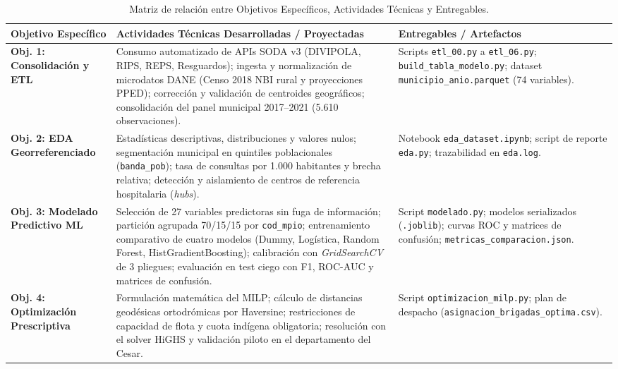 \documentclass[12pt]{article}
\begin{document}
\begin{table}[htbp]
\centering
\scriptsize
\caption{Matriz de relación entre Objetivos Específicos, Actividades Técnicas y Entregables.}
\label{tab:actividades}
\begin{tabular}{@{}>{\raggedright\arraybackslash}p{3.2cm}
                    >{\raggedright\arraybackslash}p{6.6cm}
                    >{\raggedright\arraybackslash}p{4.2cm}@{}}
\toprule
\textbf{Objetivo Específico} & \textbf{Actividades Técnicas Desarrolladas / Proyectadas} & \textbf{Entregables / Artefactos} \\
\midrule
\textbf{Obj. 1: Consolidación y ETL} & 
Consumo automatizado de APIs SODA v3 (DIVIPOLA, RIPS, REPS, Resguardos); ingesta y normalización de microdatos DANE (Censo 2018 NBI rural y proyecciones PPED); corrección y validación de centroides geográficos; consolidación del panel municipal 2017--2021 (5.610 observaciones). & 
Scripts \texttt{etl\_00.py} a \texttt{etl\_06.py}; \texttt{build\_tabla\_modelo.py}; dataset \texttt{municipio\_anio.parquet} (74 variables). \\
\midrule
\textbf{Obj. 2: EDA Georreferenciado} & 
Estadísticas descriptivas, distribuciones y valores nulos; segmentación municipal en quintiles poblacionales (\texttt{banda\_pob}); tasa de consultas por 1.000 habitantes y brecha relativa; detección y aislamiento de centros de referencia hospitalaria (\textit{hubs}). & 
Notebook \texttt{eda\_dataset.ipynb}; script de reporte \texttt{eda.py}; trazabilidad en \texttt{eda.log}. \\
\midrule
\textbf{Obj. 3: Modelado Predictivo ML} & 
Selección de 27 variables predictoras sin fuga de información; partición agrupada 70/15/15 por \texttt{cod\_mpio}; entrenamiento comparativo de cuatro modelos (Dummy, Logística, Random Forest, HistGradientBoosting); calibración con \textit{GridSearchCV} de 3 pliegues; evaluación en test ciego con F1, ROC-AUC y matrices de confusión. & 
Script \texttt{modelado.py}; modelos serializados (\texttt{.joblib}); curvas ROC y matrices de confusión; \texttt{metricas\_comparacion.json}. \\
\midrule
\textbf{Obj. 4: Optimización Prescriptiva} & 
Formulación matemática del MILP; cálculo de distancias geodésicas ortodrómicas por Haversine; restricciones de capacidad de flota y cuota indígena obligatoria; resolución con el solver HiGHS y validación piloto en el departamento del Cesar. & 
Script \texttt{optimizacion\_milp.py}; plan de despacho (\texttt{asignacion\_brigadas\_\allowbreak optima.csv}). \\
\bottomrule
\end{tabular}
\end{table}
\end{document}
